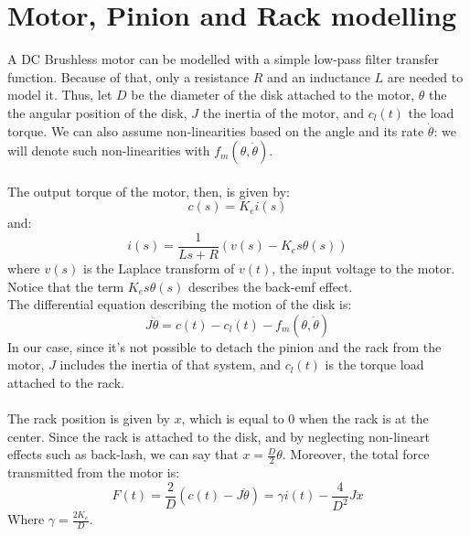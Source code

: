 \section{Motor, Pinion and Rack modelling} 
A DC Brushless motor can be modelled with a simple low-pass filter transfer function. Because of that, only a resistance $R$ and an inductance $L$ are needed to model it. Thus, let $D$ be the diameter of the disk attached to the motor, $\theta$ the the angular position of the disk, $J$ the inertia of the motor, and $c_{l}(t)$ the load torque. We can also assume non-linearities based on the angle and its rate $\dot{\theta}$:  we will denote such non-linearities with $f_{m}(\theta,\dot{\theta})$.\\ \\
 The output torque of the motor, then, is  given by:
 \begin{equation}
 c(s) = K_e i(s)
 \end{equation}
and:
\begin{equation}
i(s)=\frac{1}{Ls+R} (v(s)-K_{e}s \theta(s))
\end{equation}
where $v(s)$ is the Laplace transform of $v(t)$, the input voltage to the motor. Notice that the term $K_{e}s \theta(s)$ describes the back-emf effect. \\
The differential equation describing the motion of the disk is:
$$J\ddot{\theta}=c(t)-c_{l}(t) -f_{m}(\theta,\dot{\theta})$$
In our case, since it's not possible to detach the pinion and the rack from the motor, $J$ includes the inertia of that system, and $c_{l}(t)$ is the torque load attached to the rack. 
\\ \\
The rack position is given by $x$, which is equal to $0$ when the rack is at the center. Since the rack is attached to the disk, and by neglecting non-lineart effects such as back-lash, we can say that $x=\frac{D}{2}\theta $. Moreover,  the total force transmitted from the motor is:
$$F(t)  =  \frac{2}{D} (c(t)-J\ddot{\theta}) = \gamma i(t) - \frac{4}{D^2}J \ddot{x}$$
Where $\gamma = \frac{2K_e}{D}$. 

